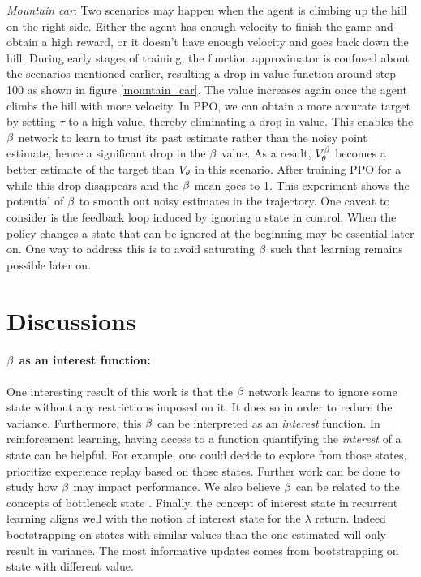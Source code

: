 \emph{Mountain car}: Two scenarios may happen when the agent is climbing up the hill on the right side. Either the agent has enough velocity to finish the game and obtain a high reward, or it doesn't have enough velocity and goes back down the hill. During early stages of training, the function approximator is confused about the scenarios mentioned earlier, resulting a drop in value function around step 100 as shown in figure \ref{mountain_car}. The value increases again once the agent climbs the hill with more velocity. In PPO, we can obtain a more accurate target by setting $\tau$ to a high value, thereby eliminating a drop in value. This enables the $\beta$ network to learn to trust its past estimate rather than the noisy point estimate, hence a significant drop in the $\beta$ value. As a result, $V^{\beta}_{\theta}$ becomes a  better estimate of the target than $V_{\theta}$ in this scenario. After training PPO for a while this drop disappears and the $\beta$ mean goes to 1. This experiment shows the potential of $\beta$ to smooth out noisy estimates in the trajectory. One caveat to consider is the feedback loop induced by ignoring a state in control. When the policy changes a state that can be ignored at the beginning may be essential later on. One way to address this is to avoid saturating $\beta$ such that learning remains possible later on.


\section{Discussions}
\paragraph{$\beta$ as an interest function:} One interesting result of this work is that the $\beta$ network learns to ignore some state without any restrictions imposed on it. It does so in order to reduce the variance. Furthermore, this $\beta$ can be interpreted as an \emph{interest} function. In reinforcement learning, having access to a function quantifying the \emph{interest} \cite{mahmood2015emphatic} of a state can be helpful. For example, one could decide to explore from those states, prioritize experience replay based on those states. Further work can be done to study how $\beta$ may impact performance. We also believe $\beta$ can be related to the concepts of bottleneck state \cite{tishby2011information}. Finally, the concept of interest state in recurrent learning aligns well with the notion of interest state for the $\lambda$ return. Indeed bootstrapping on states with similar values than the one estimated will only result in variance. The most informative updates comes from bootstrapping on state with different value. 

